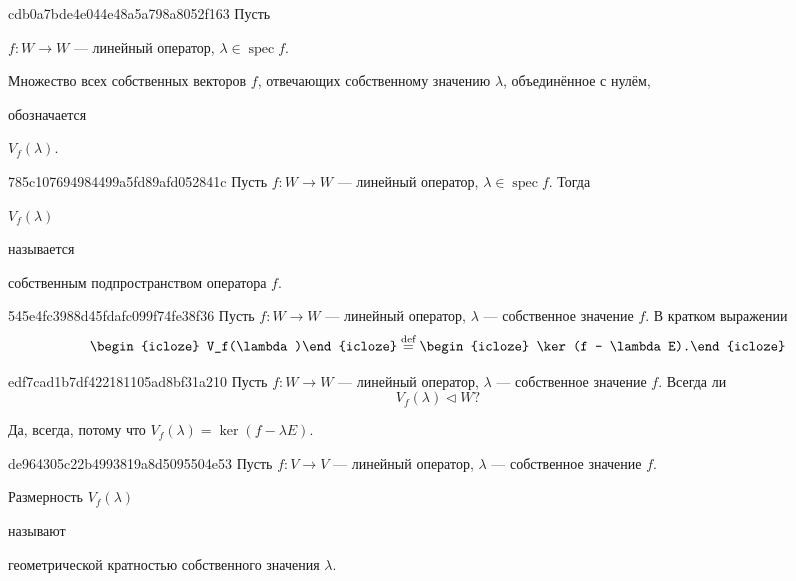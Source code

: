\begin{note}{cdb0a7bde4e044e48a5a798a8052f163}
    Пусть \begin{icloze}{3}\( f : W \to W \) --- линейный оператор, \( \lambda \in \operatorname{spec} f \).\end{icloze}
    \begin{icloze}{1}Множество всех собственных векторов \( f \), отвечающих собственному значению \( \lambda \), объединённое с нулём,\end{icloze} обозначается \begin{icloze}{2}\( V_{f} (\lambda) \).\end{icloze}
\end{note}

\begin{note}{785c107694984499a5fd89afd052841c}
    Пусть \( f : W \to W \) --- линейный оператор, \( \lambda \in \operatorname{spec} f \).
    Тогда \begin{icloze}{2}\( V_f(\lambda) \)\end{icloze} называется \begin{icloze}{1}собственным подпространством оператора \( f \).\end{icloze}
\end{note}

\begin{note}{545e4fc3988d45fdafc099f74fe38f36}
    Пусть \( f : W \to W \) --- линейный оператор, \( \lambda \) --- собственное значение \( f \).
    В кратком выражении
    \[
        \begin{icloze}{2}V_f(\lambda)\end{icloze} \overset{\text{def}}= \begin{icloze}{1}\ker (f - \lambda E).\end{icloze}
    \]
\end{note}

\begin{note}{edf7cad1b7df422181105ad8bf31a210}
    Пусть \( f : W \to W \) --- линейный оператор, \( \lambda \) --- собственное значение \( f \).
    Всегда ли
    \[
        V_{f} (\lambda) \triangleleft W?
    \]

    \begin{cloze}{1}
        Да, всегда, потому что \( V_{f} (\lambda) = \ker (f - \lambda E) \).
    \end{cloze}
\end{note}

\begin{note}{de964305c22b4993819a8d5095504e53}
    Пусть \( f : V \to V \) --- линейный оператор, \( \lambda \) --- собственное значение \( f \).
    \begin{icloze}{1}Размерность \( V_f (\lambda) \)\end{icloze} называют \begin{icloze}{2}геометрической кратностью собственного значения \( \lambda \).\end{icloze}
\end{note}

